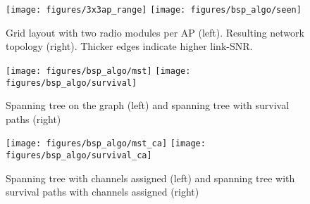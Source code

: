   \newpage
  
    \begin{figure}[h!]
      \centering
      \texttt{[image: figures/3x3ap\_range]}
      \texttt{[image: figures/bsp\_algo/seen]}
      \caption{Grid layout with two radio modules per \ac{AP} (left). Resulting network topology (right). Thicker edges indicate higher link-SNR.}
      \label{fig:3x3initial}
    \end{figure}
    
    \begin{figure}[h!]
      \centering
      \texttt{[image: figures/bsp\_algo/mst]}
      \texttt{[image: figures/bsp\_algo/survival]}
      \caption{Spanning tree on the graph (left) and spanning tree with survival paths (right)}
      \label{fig:3x3second}
    \end{figure}
    
    \begin{figure}[h!]
      \centering
      \texttt{[image: figures/bsp\_algo/mst\_ca]}
      \texttt{[image: figures/bsp\_algo/survival\_ca]}
      \caption{Spanning tree with channels assigned (left) and spanning tree with survival paths with channels assigned (right)}
      \label{fig:3x3third}
    \end{figure}
    
    \newpage
  
